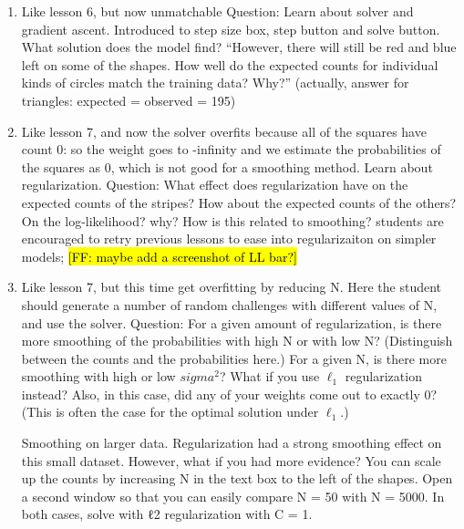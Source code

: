 \documentclass[11pt,letterpaper]{article}
\newcommand{\Note}[1]{}
\renewcommand{\Note}[1]{\hl{[#1]}}
\newcommand{\NoteSigned}[3]{{\sethlcolor{#2}\Note{#1: #3}}}
\newcommand{\NoteFF}[1]{\NoteSigned{FF}{LightBlue}{#1}}
\begin{document}
{\begin{enumerate}
\item %
Like lesson 6, but now unmatchable 
Question: Learn about solver and gradient ascent. Introduced to step size box, step button and solve button.  What solution does the model find?
``However, there will still be red and blue left on some of the shapes. How well do the expected counts for individual kinds of circles match the training data? Why?'' (actually, answer for triangles: expected = observed = 195)
\item %
Like lesson 7, and now the solver overfits because all of the squares have count 0: so the weight goes to -infinity and we estimate the probabilities of the squares as 0, which is not good for a smoothing method.  Learn about regularization.  Question: What effect does regularization have on the expected counts of the stripes?  How about the expected counts of the others?  On the log-likelihood? why? How is this related to smoothing?  
students are encouraged to retry previous lessons to ease into regularizaiton on simpler models; \NoteFF{maybe add a screenshot of LL bar?}
\item %
Like lesson 7, but this time get overfitting by reducing N.  Here the student should generate a number of random challenges with different values of N, and use the solver.  Question: For a given amount of regularization, is there more smoothing of the probabilities with high N or with low N?  (Distinguish between the counts and the probabilities here.)  For a given N, is there more smoothing with high or low $sigma^2$?
What if you use $\ell_1$ regularization instead? Also, in this case, did any of your weights come out to exactly 0? (This is often the case for the optimal solution under $\ell_1$.)

Smoothing on larger data. Regularization had a strong smoothing effect on this small dataset. However, what if you had more evidence? You can scale up the counts by increasing N in the text box to the left of the shapes. Open a second window so that you can easily compare N = 50 with N = 5000. In both cases, solve with ℓ2 regularization with C = 1.


\end{enumerate}}
\end{document}
